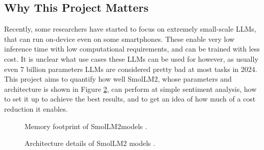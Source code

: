 \documentclass[10pt,twocolumn,letterpaper]{article}
\begin{document}
\subsection{Why This Project Matters}
Recently, some researchers have started to focus on extremely small-scale LLMs, that can run on-device even on some smartphones. These enable very low inference time with low computational requirements, and can be trained with less cost. It is unclear what use cases these LLMs can be used for however, as usually even 7 billion parameters LLMs are considered pretty bad at most tasks in 2024.
This project aims to quantify how well SmolLM2, whose parameters and architecture is shown in Figure \ref{fig:SmolLM2-parameteres}, can perform at simple sentiment analysis, how to set it up to achieve the best results, and to get an idea of how much of a cost reduction it enables.

\begin{figure}[t]
\begin{center}
\end{center}
   \caption{Memory footprint of SmolLM2models \cite{hf-SmolLM-usecase}.}
\label{fig:SmolLM2-memory}
\end{figure}


\begin{figure}[t]
\begin{center}
\end{center}
   \caption{Architecture details of SmolLM2 models \cite{hf-SmolLM-usecase}.}
\label{fig:SmolLM2-parameteres}
\end{figure}
\end{document}
